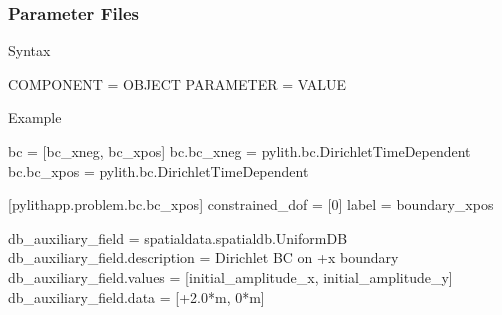 \documentclass[aspectratio=169]{beamer}
\begin{document}
\begin{frame}[fragile]
  \frametitle{Parameter Files}

  Syntax\vspace*{-8pt}%
  \begin{cfgcode}
    COMPONENT = OBJECT
    PARAMETER = VALUE
  \end{cfgcode}

  \vspace*{-4pt}%
  Example\vspace*{-8pt}%
  \begin{cfgcode}
      bc = [bc_xneg, bc_xpos]
      bc.bc_xneg = pylith.bc.DirichletTimeDependent
      bc.bc_xpos = pylith.bc.DirichletTimeDependent

      [pylithapp.problem.bc.bc_xpos]
      constrained_dof = [0]
      label = boundary_xpos

      db_auxiliary_field = spatialdata.spatialdb.UniformDB
      db_auxiliary_field.description = Dirichlet BC on +x boundary
      db_auxiliary_field.values = [initial_amplitude_x, initial_amplitude_y]
      db_auxiliary_field.data = [+2.0*m, 0*m]
    \end{cfgcode}
  
\end{frame}
\end{document}
